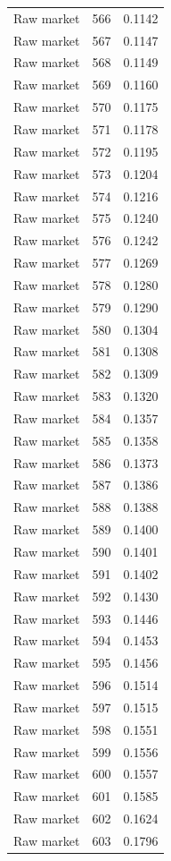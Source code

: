 \begin{table}[htbp]
\begin{tabular}{lll}
Raw market & 566 & 0.1142 \\
Raw market & 567 & 0.1147 \\
Raw market & 568 & 0.1149 \\
Raw market & 569 & 0.1160 \\
Raw market & 570 & 0.1175 \\
Raw market & 571 & 0.1178 \\
Raw market & 572 & 0.1195 \\
Raw market & 573 & 0.1204 \\
Raw market & 574 & 0.1216 \\
Raw market & 575 & 0.1240 \\
Raw market & 576 & 0.1242 \\
Raw market & 577 & 0.1269 \\
Raw market & 578 & 0.1280 \\
Raw market & 579 & 0.1290 \\
Raw market & 580 & 0.1304 \\
Raw market & 581 & 0.1308 \\
Raw market & 582 & 0.1309 \\
Raw market & 583 & 0.1320 \\
Raw market & 584 & 0.1357 \\
Raw market & 585 & 0.1358 \\
Raw market & 586 & 0.1373 \\
Raw market & 587 & 0.1386 \\
Raw market & 588 & 0.1388 \\
Raw market & 589 & 0.1400 \\
Raw market & 590 & 0.1401 \\
Raw market & 591 & 0.1402 \\
Raw market & 592 & 0.1430 \\
Raw market & 593 & 0.1446 \\
Raw market & 594 & 0.1453 \\
Raw market & 595 & 0.1456 \\
Raw market & 596 & 0.1514 \\
Raw market & 597 & 0.1515 \\
Raw market & 598 & 0.1551 \\
Raw market & 599 & 0.1556 \\
Raw market & 600 & 0.1557 \\
Raw market & 601 & 0.1585 \\
Raw market & 602 & 0.1624 \\
Raw market & 603 & 0.1796 \\

\end{tabular}
\end{table}
